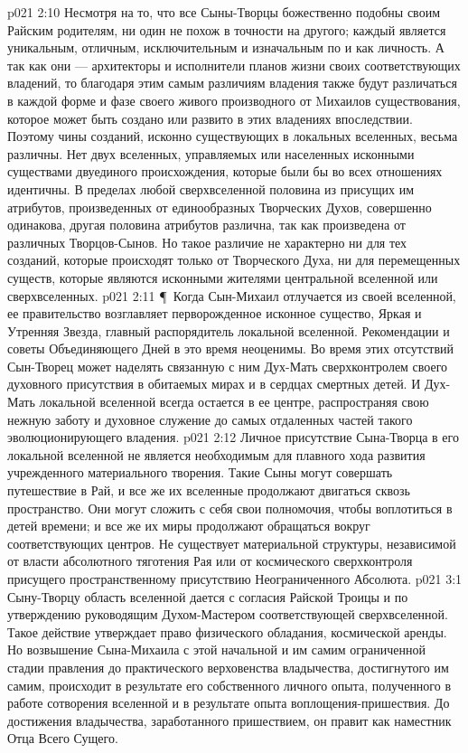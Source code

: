 \vs p021 2:10 Несмотря на то, что все Сыны\hyp{}Творцы божественно подобны своим Райским родителям, ни один не похож в точности на другого; каждый является уникальным, отличным, исключительным и изначальным по  и как личность. А так как они --- архитекторы и исполнители планов жизни своих соответствующих владений, то благодаря этим самым различиям владения также будут различаться в каждой форме и фазе своего живого производного от Mихаилов существования, которое может быть создано или развито в этих владениях впоследствии. Поэтому чины созданий, исконно существующих в локальных вселенных, весьма различны. Нет двух вселенных, управляемых или населенных исконными существами двуединого происхождения, которые были бы во всех отношениях идентичны. В пределах любой сверхвселенной половина из присущих им атрибутов, произведенных от единообразных Творческих Духов, совершенно одинакова, другая половина атрибутов различна, так как произведена от различных Творцов\hyp{}Сынов. Но такое различие не характерно ни для тех созданий, которые происходят только от Творческого Духа, ни для перемещенных существ, которые являются исконными жителями центральной вселенной или сверхвселенных.
\vs p021 2:11 \P\ Когда Сын\hyp{}Михаил отлучается из своей вселенной, ее правительство возглавляет перворожденное исконное существо, Яркая и Утренняя Звезда, главный распорядитель локальной вселенной. Рекомендации и советы Объединяющего Дней в это время неоценимы. Во время этих отсутствий Сын\hyp{}Творец может наделять связанную с ним Дух\hyp{}Мать сверхконтролем своего духовного присутствия в обитаемых мирах и в сердцах смертных детей. И Дух\hyp{}Мать локальной вселенной всегда остается в ее центре, распространяя свою нежную заботу и духовное служение до самых отдаленных частей такого эволюционирующего владения.
\vs p021 2:12 Личное присутствие Сына\hyp{}Творца в его локальной вселенной не является необходимым для плавного хода развития учрежденного материального творения. Такие Сыны могут совершать путешествие в Рай, и все же их вселенные продолжают двигаться сквозь пространство. Они могут сложить с себя свои полномочия, чтобы воплотиться в детей времени; и все же их миры продолжают обращаться вокруг соответствующих центров. Не существует материальной структуры, независимой от власти абсолютного тяготения Рая или от космического сверхконтроля присущего пространственному присутствию Неограниченного Абсолюта.
\vs p021 3:1 Сыну\hyp{}Творцу область вселенной дается с согласия Райской Троицы и по утверждению руководящим Духом\hyp{}Мастером соответствующей сверхвселенной. Такое действие утверждает право физического обладания, космической аренды. Но возвышение Сына\hyp{}Михаила с этой начальной и им самим ограниченной стадии правления до практического верховенства владычества, достигнутого им самим, происходит в результате его собственного личного опыта, полученного в работе сотворения вселенной и в результате опыта воплощения\hyp{}пришествия. До достижения владычества, заработанного пришествием, он правит как наместник Отца Всего Сущего.
